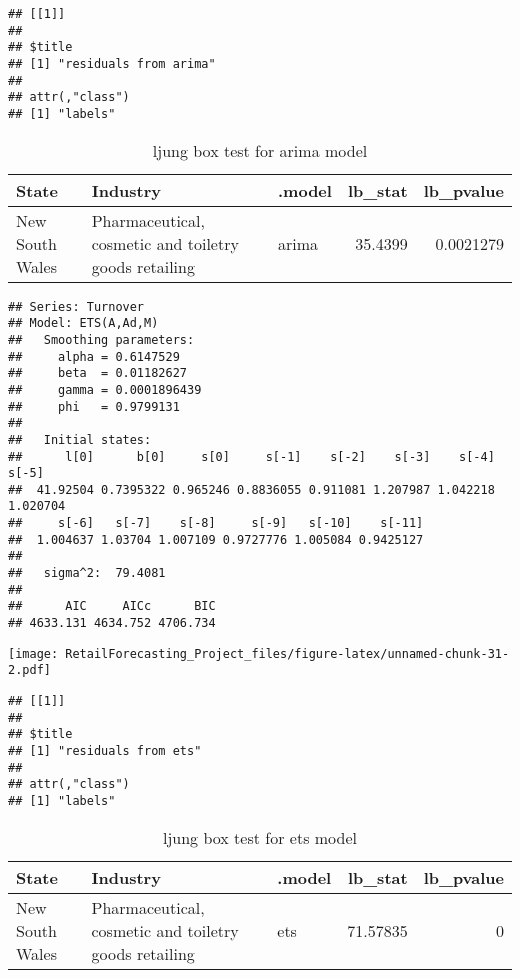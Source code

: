 \documentclass[
]{article}
\begin{document}
\begin{verbatim}
## [[1]]
## 
## $title
## [1] "residuals from arima"
## 
## attr(,"class")
## [1] "labels"
\end{verbatim}

\begin{table}

\caption{\label{tab:unnamed-chunk-31}ljung box test for arima model}
\centering
\begin{tabular}[t]{l|l|l|r|r}
\hline
State & Industry & .model & lb\_stat & lb\_pvalue\\
\hline
New South Wales & Pharmaceutical, cosmetic and toiletry goods retailing & arima & 35.4399 & 0.0021279\\
\hline
\end{tabular}
\end{table}

\begin{verbatim}
## Series: Turnover 
## Model: ETS(A,Ad,M) 
##   Smoothing parameters:
##     alpha = 0.6147529 
##     beta  = 0.01182627 
##     gamma = 0.0001896439 
##     phi   = 0.9799131 
## 
##   Initial states:
##      l[0]      b[0]     s[0]     s[-1]    s[-2]    s[-3]    s[-4]    s[-5]
##  41.92504 0.7395322 0.965246 0.8836055 0.911081 1.207987 1.042218 1.020704
##     s[-6]   s[-7]    s[-8]     s[-9]   s[-10]    s[-11]
##  1.004637 1.03704 1.007109 0.9727776 1.005084 0.9425127
## 
##   sigma^2:  79.4081
## 
##      AIC     AICc      BIC 
## 4633.131 4634.752 4706.734
\end{verbatim}

\texttt{[image: RetailForecasting\_Project\_files/figure-latex/unnamed-chunk-31-2.pdf]}

\begin{verbatim}
## [[1]]
## 
## $title
## [1] "residuals from ets"
## 
## attr(,"class")
## [1] "labels"
\end{verbatim}

\begin{table}

\caption{\label{tab:unnamed-chunk-31}ljung box test for ets model}
\centering
\begin{tabular}[t]{l|l|l|r|r}
\hline
State & Industry & .model & lb\_stat & lb\_pvalue\\
\hline
New South Wales & Pharmaceutical, cosmetic and toiletry goods retailing & ets & 71.57835 & 0\\
\hline
\end{tabular}
\end{table}
\end{document}
